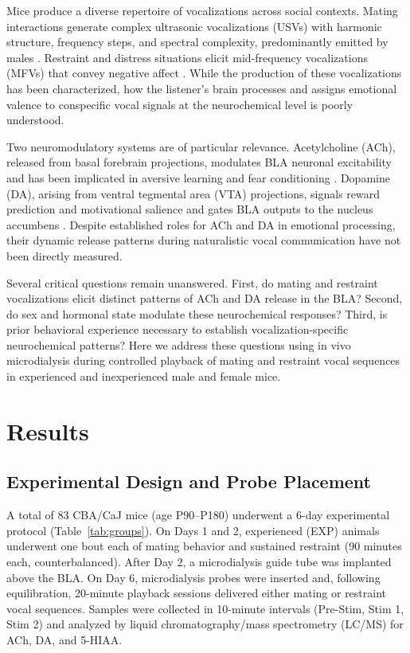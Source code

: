\documentclass[11pt]{article}
\begin{document}
Mice produce a diverse repertoire of vocalizations across social contexts. Mating interactions generate complex ultrasonic vocalizations (USVs) with harmonic structure, frequency steps, and spectral complexity, predominantly emitted by males \citep{holy2005ultrasonic}. Restraint and distress situations elicit mid-frequency vocalizations (MFVs) that convey negative affect \citep{grimsley2011auditory, ehret2005infant}. While the production of these vocalizations has been characterized, how the listener's brain processes and assigns emotional valence to conspecific vocal signals at the neurochemical level is poorly understood.

Two neuromodulatory systems are of particular relevance. Acetylcholine (ACh), released from basal forebrain projections, modulates BLA neuronal excitability and has been implicated in aversive learning and fear conditioning \citep{hasselmo2006cholinergic, baxter1999cholinergic, jiang2013cholinergic}. Dopamine (DA), arising from ventral tegmental area (VTA) projections, signals reward prediction and motivational salience and gates BLA outputs to the nucleus accumbens \citep{schultz2007multiple, stuber2011excitatory}. Despite established roles for ACh and DA in emotional processing, their dynamic release patterns during naturalistic vocal communication have not been directly measured.

Several critical questions remain unanswered. First, do mating and restraint vocalizations elicit distinct patterns of ACh and DA release in the BLA? Second, do sex and hormonal state modulate these neurochemical responses? Third, is prior behavioral experience necessary to establish vocalization-specific neurochemical patterns? Here we address these questions using in vivo microdialysis during controlled playback of mating and restraint vocal sequences in experienced and inexperienced male and female mice.

\section{Results}

\subsection{Experimental Design and Probe Placement}

A total of 83 CBA/CaJ mice (age P90--P180) underwent a 6-day experimental protocol (Table~\ref{tab:groups}). On Days 1 and 2, experienced (EXP) animals underwent one bout each of mating behavior and sustained restraint (90 minutes each, counterbalanced). After Day 2, a microdialysis guide tube was implanted above the BLA. On Day 6, microdialysis probes were inserted and, following equilibration, 20-minute playback sessions delivered either mating or restraint vocal sequences. Samples were collected in 10-minute intervals (Pre-Stim, Stim 1, Stim 2) and analyzed by liquid chromatography/mass spectrometry (LC/MS) for ACh, DA, and 5-HIAA.
\end{document}
